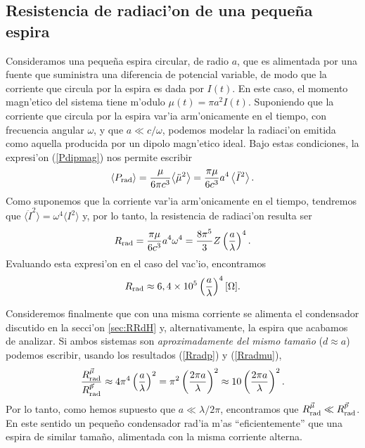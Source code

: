 \subsection{Resistencia de radiaci'on de una peque\~na espira}
Consideramos una peque\~na espira circular, de radio $a$, que es alimentada por una fuente que suministra una diferencia de potencial variable, de modo que la corriente que circula por la espira es dada por $I(t)$. En este caso, el momento magn'etico del sistema tiene m'odulo $\mu(t)=\pi a^2I(t)$. Suponiendo que la corriente que circula por la espira var'ia arm'onicamente en el tiempo, con frecuencia angular $\omega$, y que $a\ll c/\omega$, podemos modelar la radiaci'on emitida como aquella producida por un dipolo magn'etico ideal. Bajo estas condiciones, la expresi'on (\ref{Pdipmag}) nos permite escribir
\begin{equation}
\left\langle P_{\rm rad}\right\rangle=\frac{\mu}{6\pi c^3}{\left\langle \ddot{\mu}^2\right\rangle}=\frac{\pi\mu}{6c^3}{a^4}\left\langle \ddot{I}^ 2\right\rangle .
\end{equation}
Como suponemos que la corriente var'ia arm'onicamente en el tiempo, tendremos que $\langle\ddot{I}^ 2\rangle=\omega^4\langle I^ 2\rangle$ y, por lo tanto, la resistencia de radiaci'on resulta ser
\begin{equation}
R_{\rm rad}=\frac{\pi\mu}{6c^3}{a^4\omega^4}
=\frac{8\pi^5}{3}Z\left(\frac{a}{\lambda}\right)^4.
\end{equation}
Evaluando esta expresi'on en el caso del vac'io, encontramos
\begin{equation}\label{Rradmu}
R_{\rm rad}\approx 6,4\times 10^{5}\left(\frac{a}{\lambda}\right)^4 [\Omega].
\end{equation}

Consideremos finalmente que con una misma corriente se alimenta el condensador discutido en la secci'on \ref{sec:RRdH} y, alternativamente, la espira que acabamos de analizar. Si ambos sistemas son \textit{aproximadamente del mismo tama\~no} ($d\approx a$) podemos escribir, usando los resultados (\ref{Rradp}) y (\ref{Rradmu}), 
\begin{equation}
\frac{R_{\rm rad}^{\vec\mu}}{R_{\rm rad}^{\vec{p}}}\approx 4\pi^4\left(\frac{a}{\lambda}\right)^2=\pi^2\left(\frac{2\pi a}{\lambda}\right)^2\approx 10\left(\frac{2\pi a}{\lambda}\right)^2.
\end{equation}
Por lo tanto, como hemos supuesto que $a\ll\lambda/2\pi$, encontramos que  $R_{\rm rad}^{\vec\mu}\ll R_{\rm rad}^{\vec{p}}$. En este sentido un peque\~no condensador rad'ia m'as ``eficientemente'' que una espira de similar tama\~no, alimentada con la misma corriente alterna.


